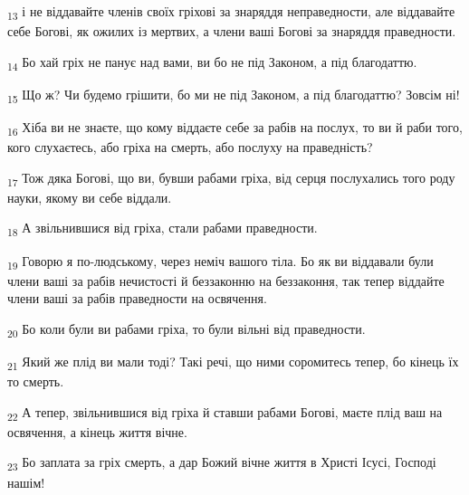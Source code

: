 \begin{tcolorbox}
\textsubscript{13} і не віддавайте членів своїх гріхові за знаряддя неправедности, але віддавайте себе Богові, як ожилих із мертвих, а члени ваші Богові за знаряддя праведности.
\end{tcolorbox}
\begin{tcolorbox}
\textsubscript{14} Бо хай гріх не панує над вами, ви бо не під Законом, а під благодаттю.
\end{tcolorbox}
\begin{tcolorbox}
\textsubscript{15} Що ж? Чи будемо грішити, бо ми не під Законом, а під благодаттю? Зовсім ні!
\end{tcolorbox}
\begin{tcolorbox}
\textsubscript{16} Хіба ви не знаєте, що кому віддаєте себе за рабів на послух, то ви й раби того, кого слухаєтесь, або гріха на смерть, або послуху на праведність?
\end{tcolorbox}
\begin{tcolorbox}
\textsubscript{17} Тож дяка Богові, що ви, бувши рабами гріха, від серця послухались того роду науки, якому ви себе віддали.
\end{tcolorbox}
\begin{tcolorbox}
\textsubscript{18} А звільнившися від гріха, стали рабами праведности.
\end{tcolorbox}
\begin{tcolorbox}
\textsubscript{19} Говорю я по-людському, через неміч вашого тіла. Бо як ви віддавали були члени ваші за рабів нечистості й беззаконню на беззаконня, так тепер віддайте члени ваші за рабів праведности на освячення.
\end{tcolorbox}
\begin{tcolorbox}
\textsubscript{20} Бо коли були ви рабами гріха, то були вільні від праведности.
\end{tcolorbox}
\begin{tcolorbox}
\textsubscript{21} Який же плід ви мали тоді? Такі речі, що ними соромитесь тепер, бо кінець їх то смерть.
\end{tcolorbox}
\begin{tcolorbox}
\textsubscript{22} А тепер, звільнившися від гріха й ставши рабами Богові, маєте плід ваш на освячення, а кінець життя вічне.
\end{tcolorbox}
\begin{tcolorbox}
\textsubscript{23} Бо заплата за гріх смерть, а дар Божий вічне життя в Христі Ісусі, Господі нашім!
\end{tcolorbox}
